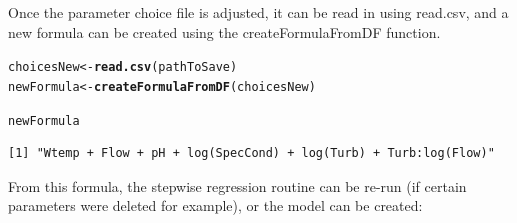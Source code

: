\documentclass[a4paper,11pt]{article}\usepackage[]{graphicx}\usepackage[]{color}
\makeatletter
\newcommand{\hlstd}[1]{\textcolor[rgb]{0.345,0.345,0.345}{#1}}%
\newcommand{\hlkwb}[1]{\textcolor[rgb]{0.69,0.353,0.396}{#1}}%
\newcommand{\hlkwd}[1]{\textcolor[rgb]{0.737,0.353,0.396}{\textbf{#1}}}%
\newenvironment{kframe}{%
 \def\at@end@of@kframe{}%
 \ifinner\ifhmode%
  \def\at@end@of@kframe{\end{minipage}}%
  \begin{minipage}{\columnwidth}%
 \fi\fi%
 \def\FrameCommand##1{\hskip\@totalleftmargin \hskip-\fboxsep
 \colorbox{shadecolor}{##1}\hskip-\fboxsep
     \hskip-\linewidth \hskip-\@totalleftmargin \hskip\columnwidth}%
 \MakeFramed {\advance\hsize-\width
   \@totalleftmargin\z@ \linewidth\hsize
   \@setminipage}}%
 {\par\unskip\endMakeFramed%
 \at@end@of@kframe}
\newenvironment{knitrout}{}{} %
\makeatother
\begin{document}
Once the parameter choice file is adjusted, it can be read in using read.csv, and a new formula can be created using the createFormulaFromDF function.

\begin{knitrout}
\color{fgcolor}\begin{kframe}
\begin{alltt}
\hlstd{choicesNew} \hlkwb{<-} \hlkwd{read.csv}\hlstd{(pathToSave)}
\hlstd{newFormula} \hlkwb{<-}\hlkwd{createFormulaFromDF}\hlstd{(choicesNew)}
\end{alltt}
\end{kframe}
\end{knitrout}



\begin{knitrout}
\color{fgcolor}\begin{kframe}
\begin{alltt}
\hlstd{newFormula}
\end{alltt}
\begin{verbatim}
[1] "Wtemp + Flow + pH + log(SpecCond) + log(Turb) + Turb:log(Flow)"
\end{verbatim}
\end{kframe}
\end{knitrout}

From this formula, the stepwise regression routine can be re-run (if certain parameters were deleted for example), or the model can be created:
\end{document}
